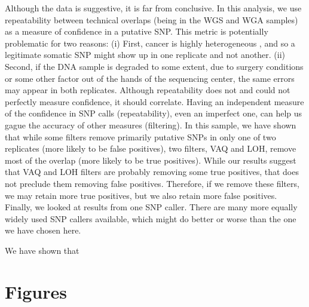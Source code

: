 \documentclass[11pt]{article} %
\begin{document}
Although the data is suggestive, it is far from conclusive. In this analysis, we use repeatability between technical overlaps (being in the WGS and WGA samples) as a measure of confidence in a putative SNP. This metric is potentially problematic for two reasons:
(i) First, cancer is highly heterogeneous \cite{hetero}, and so a legitimate somatic SNP might show up in one replicate and not another.
(ii) Second, if the DNA sample is degraded to some extent, due to surgery conditions or some other factor out of the hands of the sequencing center, the same errors may appear in both replicates. Although repeatability does not and could not perfectly measure confidence, it should correlate. Having an independent measure of the confidence in SNP calls (repeatability), even an imperfect one, can help us gague the accuracy of other measures (filtering).  
In this sample, we have shown that while some filters remove primarily putative SNPs in only one of two replicates (more likely to be false positives), two filters, VAQ and LOH, remove most of the overlap (more likely to be true positives). While our results suggest that VAQ and LOH filters are probably removing some true positives, that does not preclude them removing false positives. Therefore, if we remove these filters, we may retain more true positives, but we also retain more false positives.
Finally, we looked at results from one SNP caller. There are many more equally widely used SNP callers available, which might do better or worse than the one we have chosen here.

We have shown that 

\section{Figures}
\end{document}
